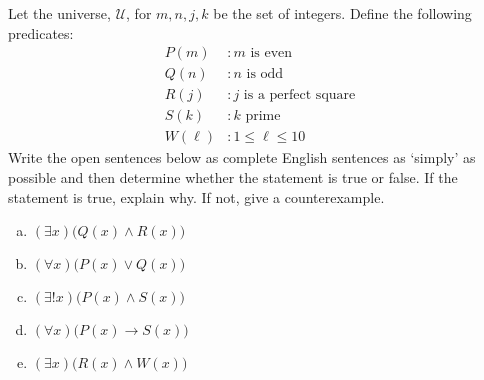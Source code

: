 \documentclass[11pt,letterpaper]{article}
\begin{document}
	

\newpage



 Let the universe, $\mathcal{U}$, for $m, n, j, k$ be the set of integers. Define the following predicates:
	\[
	\begin{aligned}
	P(m) &\colon m \text{ is even} \\
	Q(n) &\colon n \text{ is odd} \\
	R(j) &\colon j \text{ is a perfect square} \\
	S(k) &\colon k \text{ prime} \\
	W(\ell) &\colon 1 \leq \ell \leq 10
	\end{aligned}
	\]
Write the open sentences below as complete English sentences as `simply' as possible and then determine whether the statement is true or false. If the statement is true, explain why. If not, give a counterexample. 
	\begin{enumerate}[(a)]
	\item $(\exists x) \big( Q(x) \wedge R(x) \big)$
	\item $(\forall x) \big( P(x) \vee Q(x) \big)$
	\item $(\exists! x) \big( P(x) \wedge S(x) \big)$
	\item $(\forall x) \big( P(x) \to S(x) \big)$
	\item $(\exists x) \big(R(x) \wedge W(x) \big)$
	\end{enumerate} \pspace
\end{document}
